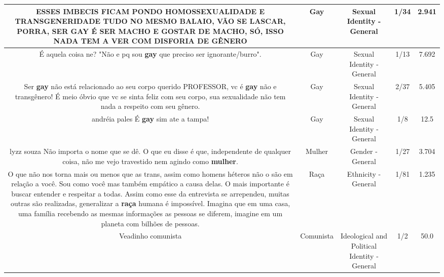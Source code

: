 \documentclass[11pt]{article}
\newlength\mylength
\begin{document}
\begin{center}
\begin{longtable}{|C{.65\mylength}|C{.30\mylength}|C{.12\mylength}|C{.12\mylength}|C{.12\mylength}|}
  \small ESSES IMBECIS FICAM PONDO HOMOSSEXUALIDADE E TRANSGENERIDADE TUDO NO MESMO BALAIO, VÃO SE LASCAR, PORRA, SER \textbf{GAY} É SER MACHO E GOSTAR DE MACHO, SÓ, ISSO NADA TEM A VER COM DISFORIA DE GÊNERO\normalsize   & Gay & Sexual Identity - General & 1/34 & 2.941 \\  \hline
  \small É aquela coisa ne? "Não e pq sou \textbf{gay} que preciso ser ignorante/burro".\normalsize   & Gay & Sexual Identity - General & 1/13 & 7.692 \\  \hline
  \small Ser \textbf{gay} não está relacionado ao seu corpo querido PROFESSOR, vc é \textbf{gay} não e transgênero! É meio óbvio que vc se sinta feliz com seu corpo, sua sexualidade não tem nada a respeito com seu gênero.\normalsize   & Gay & Sexual Identity - General & 2/37 & 5.405 \\  \hline
  \small andréia pales É \textbf{gay} sim ate a tampa!\normalsize   & Gay & Sexual Identity - General & 1/8 & 12.5 \\  \hline
  \small lyzz souza Não importa o nome que se dê. O que eu disse é que, independente de qualquer coisa, não me vejo travestido nem agindo como \textbf{mulher}.\normalsize   & Mulher & Gender - General & 1/27 & 3.704 \\  \hline
  \small O que não nos torna mais ou menos que as trans, assim como homens héteros não o são em relação a você. Sou como você mas também empático a causa delas. O mais importante é buscar entender e respeitar a todas. Assim como esse da entrevista se arrependeu, muitas outras são realizadas, generalizar a \textbf{raça} humana é impossível. Imagina que em uma casa, uma família recebendo as mesmas informações as pessoas se diferem, imagine em um planeta com bilhões de pessoas.\normalsize   & Raça & Ethnicity - General & 1/81 & 1.235 \\  \hline
  \small Veadinho comunista\normalsize   & Comunista & Ideological and Political Identity - General & 1/2 & 50.0 \\  \hline

\end{longtable}
\end{center}
\end{document}
